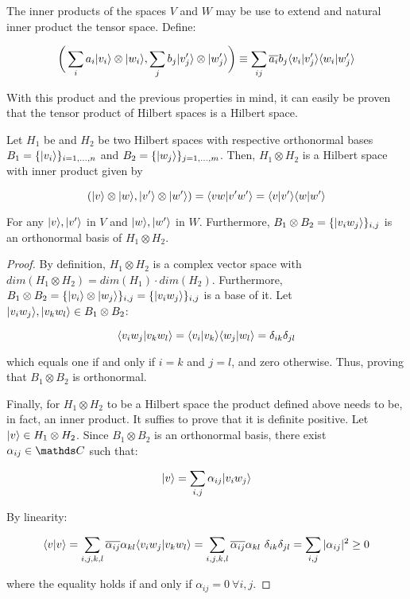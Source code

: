 The inner products of the spaces $V$ and $W$ may be use to extend and natural inner product the tensor space. Define:

$$ \bigg ( \sum_i a_i |v_i\rangle \otimes |w_i\rangle, \sum_j b_j |v_j'\rangle \otimes |w_j'\rangle \bigg ) \equiv
		\sum_{ij} \overline{a_i} b_j \langle v_i|v_j' \rangle \langle w_i|w_j' \rangle $$

With this product and the previous properties in mind, it can easily be proven that the tensor product of Hilbert spaces is a Hilbert space.

\begin{proposition}
	Let $H_1$ be and $H_2$ be two Hilbert spaces with respective orthonormal bases $B_1 = \{|v_i\rangle\}_{i=1,\dots,n}$ and $B_2 = \{|w_j\rangle\}_{j=1,\dots,m}$. Then, $H_1 \otimes H_2$ is a Hilbert space with inner product given by
	
	$$ ( |v\rangle \otimes |w\rangle, |v'\rangle \otimes |w'\rangle) = \langle vw|v'w'\rangle = \langle v|v'\rangle\langle w|w'\rangle $$
	
	For any $|v\rangle, |v'\rangle$ in $V$ and $|w\rangle, |w'\rangle$ in $W$. Furthermore, $B_1 \otimes B_2 = \{|v_i w_j\rangle\}_{i,j}$ is an orthonormal basis of $H_1 \otimes H_2$.
\end{proposition}

\begin{proof}
	By definition, $H_1 \otimes H_2$ is a complex vector space with $dim(H_1 \otimes H_2) = dim(H_1) \cdot dim(H_2)$. Furthermore, $B_1 \otimes B_2 = \{|v_i\rangle \otimes |w_j\rangle\}_{i,j} = \{|v_i w_j\rangle\}_{i,j}$ is a base of it. Let $|v_i w_j\rangle, |v_k w_l\rangle \in B_1 \otimes B_2$:
	
	$$ \langle v_i w_j|v_k w_l \rangle = \langle v_i|v_k \rangle \langle w_j|w_l \rangle = \delta_{ik} \delta_{jl} $$
	
	which equals one if and only if $i = k$ and $j = l$, and zero otherwise. Thus, proving that $B_1 \otimes B_2$ is orthonormal.
	
	Finally, for $H_1 \otimes H_2$ to be a Hilbert space the product defined above needs to be, in fact, an inner product. It suffies to prove that it is definite positive. Let $|v\rangle \in H_1 \otimes H_2$. Since $B_1 \otimes B_2$ is an orthonormal basis, there exist $\alpha_{ij} \in \C$ such that:
	
	$$ |v\rangle = \sum_{i,j} \alpha_{ij} |v_i w_j\rangle $$
	
	By linearity:
	
	$$ \langle v|v \rangle = \sum_{i,j,k,l} \overline{\alpha_{ij}} \alpha_{kl} \langle v_i w_j|v_k w_l \rangle = \sum_{i,j,k,l} \overline{\alpha_{ij}} \alpha_{kl} \  \delta_{ik} \delta_{jl} = \sum_{i,j} |\alpha_{ij}|^2  \geq 0 $$
	
	where the equality holds if and only if $\alpha_{ij} = 0 \ \forall i,j$.
\end{proof}

